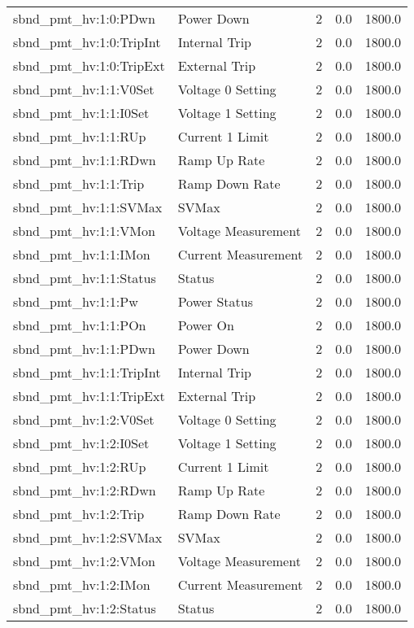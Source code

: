 \begin{center}
\begin{longtable}{l | l l l l }
sbnd\_pmt\_hv:1:0:PDwn & Power Down & 2 & 0.0 & 1800.0\\ 
sbnd\_pmt\_hv:1:0:TripInt & Internal Trip & 2 & 0.0 & 1800.0\\ 
sbnd\_pmt\_hv:1:0:TripExt & External Trip & 2 & 0.0 & 1800.0\\ 
sbnd\_pmt\_hv:1:1:V0Set & Voltage 0 Setting & 2 & 0.0 & 1800.0\\ 
sbnd\_pmt\_hv:1:1:I0Set & Voltage 1 Setting & 2 & 0.0 & 1800.0\\ 
sbnd\_pmt\_hv:1:1:RUp & Current 1 Limit & 2 & 0.0 & 1800.0\\ 
sbnd\_pmt\_hv:1:1:RDwn & Ramp Up Rate & 2 & 0.0 & 1800.0\\ 
sbnd\_pmt\_hv:1:1:Trip & Ramp Down Rate & 2 & 0.0 & 1800.0\\ 
sbnd\_pmt\_hv:1:1:SVMax & SVMax & 2 & 0.0 & 1800.0\\ 
sbnd\_pmt\_hv:1:1:VMon & Voltage Measurement & 2 & 0.0 & 1800.0\\ 
sbnd\_pmt\_hv:1:1:IMon & Current Measurement & 2 & 0.0 & 1800.0\\ 
sbnd\_pmt\_hv:1:1:Status & Status & 2 & 0.0 & 1800.0\\ 
sbnd\_pmt\_hv:1:1:Pw & Power Status & 2 & 0.0 & 1800.0\\ 
sbnd\_pmt\_hv:1:1:POn & Power On & 2 & 0.0 & 1800.0\\ 
sbnd\_pmt\_hv:1:1:PDwn & Power Down & 2 & 0.0 & 1800.0\\ 
sbnd\_pmt\_hv:1:1:TripInt & Internal Trip & 2 & 0.0 & 1800.0\\ 
sbnd\_pmt\_hv:1:1:TripExt & External Trip & 2 & 0.0 & 1800.0\\ 
sbnd\_pmt\_hv:1:2:V0Set & Voltage 0 Setting & 2 & 0.0 & 1800.0\\ 
sbnd\_pmt\_hv:1:2:I0Set & Voltage 1 Setting & 2 & 0.0 & 1800.0\\ 
sbnd\_pmt\_hv:1:2:RUp & Current 1 Limit & 2 & 0.0 & 1800.0\\ 
sbnd\_pmt\_hv:1:2:RDwn & Ramp Up Rate & 2 & 0.0 & 1800.0\\ 
sbnd\_pmt\_hv:1:2:Trip & Ramp Down Rate & 2 & 0.0 & 1800.0\\ 
sbnd\_pmt\_hv:1:2:SVMax & SVMax & 2 & 0.0 & 1800.0\\ 
sbnd\_pmt\_hv:1:2:VMon & Voltage Measurement & 2 & 0.0 & 1800.0\\ 
sbnd\_pmt\_hv:1:2:IMon & Current Measurement & 2 & 0.0 & 1800.0\\ 
sbnd\_pmt\_hv:1:2:Status & Status & 2 & 0.0 & 1800.0\\ 

\end{longtable}
\end{center}

